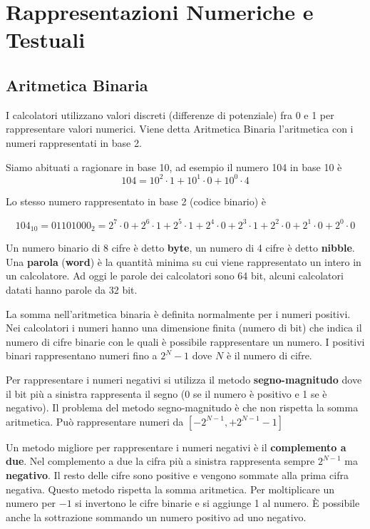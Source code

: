 \chapter{Rappresentazioni Numeriche e Testuali}

\section{Aritmetica Binaria}

I calcolatori utilizzano valori discreti (differenze di potenziale) fra 0 e 1 per rappresentare valori numerici. Viene detta Aritmetica Binaria l'aritmetica con i numeri rappresentati in base 2.

Siamo abituati a ragionare in base 10, ad esempio il numero 104 in base 10 è 
\[ 104 = 10^2 \cdot 1 + 10^1 \cdot 0 + 10^0 \cdot 4 \]

Lo stesso numero rappresentato in base 2 (codice binario) è

\[ 104_{10} = 01101000_2 = 2^7 \cdot 0 + 2^6 \cdot 1 + 2^5 \cdot 1 + 2^4 \cdot 0 + 2^3 \cdot 1 + 2^2 \cdot 0 + 2^1 \cdot 0 + 2^0 \cdot 0 \]

Un numero binario di 8 cifre è detto \textbf{byte}, un numero di 4 cifre è detto \textbf{nibble}. Una \textbf{parola} (\textbf{word}) è la quantità minima su cui viene rappresentato un intero in un calcolatore. Ad oggi le parole dei calcolatori sono 64 bit, alcuni calcolatori datati hanno parole da 32 bit.

La somma nell'aritmetica binaria è definita normalmente per i numeri positivi. Nei calcolatori i numeri hanno una dimensione finita (numero di bit) che indica il numero di cifre binarie con le quali è possibile rappresentare un numero. I positivi binari rappresentano numeri fino a $ 2^{N}-1 $ dove $ N $ è il numero di cifre.

Per rappresentare i numeri negativi si utilizza il metodo \textbf{segno-magnitudo} dove il bit più a sinistra rappresenta il segno (0 se il numero è positivo e 1 se è negativo). Il problema del metodo segno-magnitudo è che non rispetta la somma aritmetica. Può rappresentare numeri da $ [-2^{N-1}, +2^{N-1} - 1] $

Un metodo migliore per rappresentare i numeri negativi è il \textbf{complemento a due}. Nel complemento a due la cifra più a sinistra rappresenta sempre $ 2^{N-1} $ ma \textbf{negativo}. Il resto delle cifre sono positive e vengono sommate alla prima cifra negativa. Questo metodo rispetta la somma aritmetica. Per moltiplicare un numero per $ -1 $ si invertono le cifre binarie e si aggiunge 1 al numero. È possibile anche la sottrazione sommando un numero positivo ad uno negativo.

